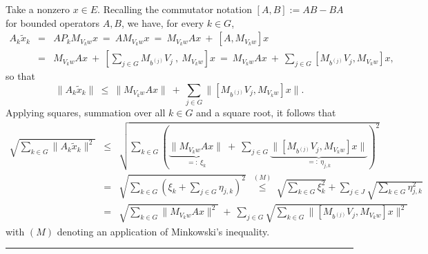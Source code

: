 \documentclass{article}
\newcommand\Proofend{\rule{2mm}{2mm}}
\renewenvironment{proof}
 {\par\noindent{\bf Proof.}}
 {\Proofend\par\pagebreak[2]}
\numberwithin{equation}{section}   %
\numberwithin{figure}{section}  %
\begin{document}
\begin{proof}
Take a nonzero $x\in E$. Recalling the commutator notation $[A,B]:=AB-BA$ for bounded operators $A,B$, we have, for every $k\in G$,
\begin{eqnarray*}
A_k\tilde x_k &=& AP_kM_{V_kw}x \ =\ AM_{V_kw}x \ =\ M_{V_kw}Ax\ +\ [A,M_{V_kw}]x\\
&=& M_{V_kw}Ax\ +\ \left[\sum_{j\in G} M_{b^{(j)}}V_j\ ,\ M_{V_kw}\right]x
\ =\ M_{V_kw}Ax\ +\ \sum_{j\in G} [M_{b^{(j)}}V_j,M_{V_kw}]x,
\end{eqnarray*}
so that
\[
\|A_k\tilde x_k\| \ \le\ \|M_{V_kw}Ax\|\ +\ \sum_{j\in G} \|[M_{b^{(j)}}V_j,M_{V_kw}]x\|.
\]
Applying squares, summation over all $k\in G$ and a square root, it follows that
\begin{eqnarray}
\sqrt{\sum_{k\in G} \|A_k\tilde x_k\|^2} &\le&
\sqrt{\sum_{k\in G}\left(\underbrace{\|M_{V_kw}Ax\|}_{=:\ \xi_k}\ +\ \sum_{j\in G} \underbrace{\|[M_{b^{(j)}}V_j,M_{V_kw}]x\|}_{=:\ \eta_{j,k}}\right)^2}\nonumber\\ 
&=& \sqrt{\sum_{k\in G}(\xi_k+\sum_{j\in G} \eta_{j,k})^2}\ 
\ \stackrel{(M)}\le%
\ \sqrt{\sum_{k\in G} \xi_k^2}+\sum_{j\in J}\sqrt{\sum_{k\in G}\eta_{j,k}^2}\nonumber\\
&=& \sqrt{\sum_{k\in G}\|M_{V_kw}Ax\|^2}\ +\ \sum_{j\in G}\sqrt{\sum_{k\in G}\|[M_{b^{(j)}}V_j,M_{V_kw}]x\|^2} \label{eq:tag1}
\end{eqnarray}
with $(M)$ denoting an application of Minkowski's inequality.


\end{proof}
\end{document}
